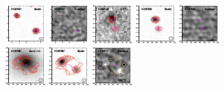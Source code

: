 \documentclass[iop]{emulateapj}
\begin{document}
\begin{figure}[!tbp]
\begin{centering}
\includegraphics[width=0.162\textwidth]{../Figures/modelfit/HXMM31_model_bestfit.pdf}
\includegraphics[width=0.162\textwidth]{../Figures/modelfit/HXMM31_residual_bestfit.pdf}
\includegraphics[width=0.162\textwidth]{../Figures/modelfit/HXMM29_optical_bestfit.pdf}
\includegraphics[width=0.162\textwidth]{../Figures/modelfit/HXMM29_model_bestfit.pdf}
\includegraphics[width=0.162\textwidth]{../Figures/modelfit/HXMM29_residual_bestfit.pdf}
\includegraphics[width=0.162\textwidth]{../Figures/modelfit/HXMM07_optical_bestfit.pdf}
\includegraphics[width=0.162\textwidth]{../Figures/modelfit/HXMM07_model_bestfit.pdf}
\includegraphics[width=0.162\textwidth]{../Figures/modelfit/HXMM07_residual_bestfit.pdf}

\end{centering}
\end{figure}
\end{document}
